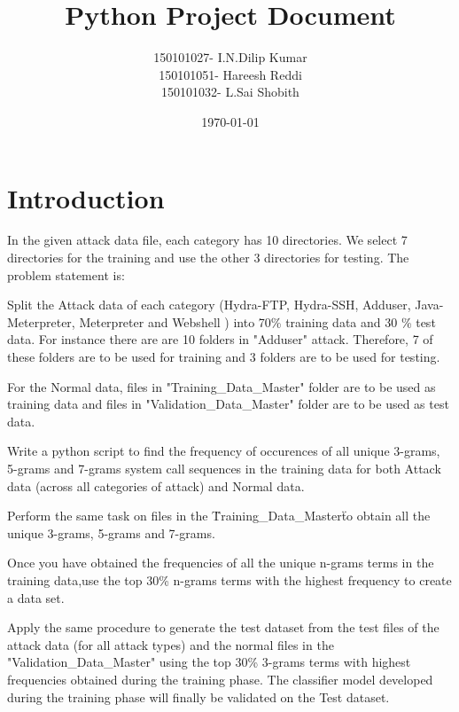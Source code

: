 \documentclass[a4paper,11pt]{article}
\begin{document}
\title{Python Project Document}
\author{150101027- I.N.Dilip Kumar\\ 150101051- Hareesh Reddi\\ 150101032- L.Sai Shobith}
\date{\today}
\maketitle
\tableofcontents{}
\section{Introduction}
In the given attack data file, each category has 10 directories. We select 7 directories for the training and use the other 3 directories for testing. \newline
The problem statement is:

Split the Attack data of each category (Hydra-FTP, Hydra-SSH, Adduser, Java-Meterpreter, Meterpreter and Webshell ) into 70\% training data and 30 \% test data. For instance there are
are 10 folders in "Adduser" attack. Therefore, 7 of these folders are to be used for training and 3 folders are to be used for testing.

For the Normal data, files in "Training\_Data\_Master" folder are to be used as training data and files in "Validation\_Data\_Master" folder are to be used as test data.

Write a python script to find the frequency of occurences of all unique 3-grams, 5-grams and 7-grams system call sequences in the training data for both Attack data (across all categories of attack) and Normal data.

Perform the same task on files in the \"Training\_Data\_Master\" to obtain all the unique 3-grams, 5-grams and 7-grams.

Once you have obtained the frequencies of all the unique n-grams terms in the training data,use the top 30\% n-grams terms with the highest frequency to create a data set.

Apply the same procedure to generate the test dataset from the test files of the attack data (for all attack types) and the normal files in the "Validation\_Data\_Master" using the top 
30\% 3-grams terms with highest frequencies obtained during the training phase. The classifier model developed during the training phase will finally be validated on the Test dataset.
\end{document}
